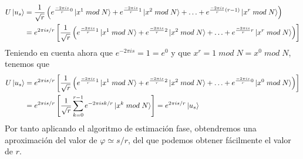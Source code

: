 \documentclass[a4paper]{article}
\numberwithin{equation}{section}
\newcommand{\modd}{\; mod \;}
\begin{document}
\begin{equation}
\begin{split}
U\ket{u_s} &=
\frac{1}{\sqrt{r}} \left(
e^{\frac{-2\pi is}{r}0} \ket{x^1 \modd N} +
e^{\frac{-2\pi is}{r}1} \ket{x^2 \modd N} + \ldots +
e^{\frac{-2\pi is}{r}(r-1)} \ket{x^r \modd N} \right)
\\ &=
e^{2\pi is/r} \left[
\frac{1}{\sqrt{r}} \left(
e^{\frac{-2\pi is}{r}1} \ket{x^1 \modd N} +
e^{\frac{-2\pi is}{r}2} \ket{x^2 \modd N} + \ldots +
e^{\frac{-2\pi is}{r}r} \ket{x^r \modd N} \right) \right]
\end{split}
\end{equation}
Teniendo en cuenta ahora que $e^{-2\pi is} = 1 = e^0$ y que $x^r = 1 \modd N = x^0 \modd N$, tenemos que
\begin{equation}
\begin{split}
U\ket{u_s} &=
e^{2\pi is/r} \left[
\frac{1}{\sqrt{r}} \left(
e^{\frac{-2\pi is}{r}1} \ket{x^1 \modd N} +
e^{\frac{-2\pi is}{r}2} \ket{x^2 \modd N} + \ldots +
e^{\frac{-2\pi is}{r}0} \ket{x^0 \modd N} \right) \right]
\\ &=
e^{2\pi is/r} \left[ \frac{1}{\sqrt{r}} \sum_{k=0}^{r-1} e^{-2\pi isk/r}\ket{x^k \modd N} \right]
= e^{2\pi is/r} \ket{u_s}
\end{split}
\end{equation}
Por tanto aplicando el algoritmo de estimación fase, obtendremos una aproximación del valor de $\varphi \simeq s/r$, del que podemos obtener fácilmente el valor de $r$.\\
\end{document}
